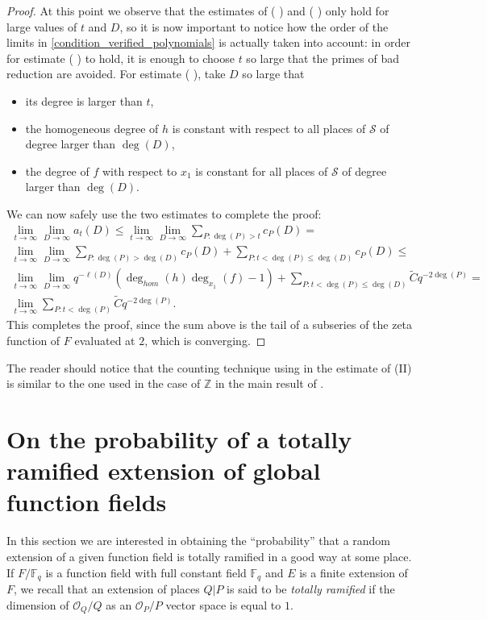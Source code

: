 \documentclass[10pt]{amsart}
\newcommand{\vF}{\mathbb{F}}
\newcommand{\vZ}{\mathbb{Z}}
\newcommand{\cO}{\mathcal{O}}
\newcommand{\cS}{\mathcal{S}}
\newcommand{\RN}[1]{%
  \textup{\uppercase\expandafter{\romannumeral#1}}%
}
\theoremstyle{definition}
\theoremstyle{remark}
\numberwithin{equation}{section}
\begin{document}
\begin{proof}
At this point we observe that the estimates of (\RN{1}) and (\RN{2}) only hold for large values of $t$ and $D$, so it is now important to notice how the order of the limits in \eqref{condition_verified_polynomials} is actually taken into account: in order for estimate (\RN{1}) to hold, it is enough to choose $t$ so large that the primes of bad reduction are avoided. For estimate (\RN{2}), take $D$ so large that 
\begin{itemize}
\item its degree is larger than $t$,
\item the homogeneous degree of $h$ is constant with respect to all places of $\cS$ of degree larger than $\deg(D)$,
\item the degree of $f$ with respect to $x_1$ is constant for all places of $\cS$ of degree larger than $\deg(D)$.
\end{itemize}
We can now safely use the two estimates to complete the proof:
\begin{align*}
\lim_{t\rightarrow \infty} \lim_{D\rightarrow \infty} a_t(D)\leq  \lim_{t\rightarrow \infty} \lim_{D\rightarrow \infty}\sum_{P:\deg(P)>t} c_P(D)=&\\
\lim_{t\rightarrow \infty} \lim_{D\rightarrow \infty} \sum_{P:\deg(P)> \deg(D)}c_P(D)+\sum_{P:t<\deg(P)\leq \deg(D)} c_P(D)\leq &\\
\lim_{t\rightarrow \infty} \lim_{D\rightarrow \infty} q^{-\ell(D)} (\deg_{hom}(h)\deg_{x_1}(f)-1)+ \sum_{P:t<\deg(P)\leq \deg(D)} \widetilde{C}q^{-2\deg(P)}=\\
\lim_{t\rightarrow \infty} \sum_{P:t<\deg(P)} \widetilde{C}q^{-2\deg(P)}.
\end{align*}
This completes the proof, since the sum above is the tail of a subseries of the zeta function of $F$ evaluated at $2$, which is converging.
\end{proof}

The reader should notice that the counting technique using in the estimate of (II) is similar to the one used in the case of $\vZ$ in the main result of \cite{torsten1991infinite}.

\section{On the probability of a totally ramified extension of global function fields}\label{sec:probabilityoftotram}

In this section we are interested in obtaining the ``probability'' that a random extension of a given function field is totally ramified in a good way at some place. 
If $F/\vF_q$ is a function field with full constant field $\vF_q$ and $E$ is a finite extension of $F$, we recall that an extension of places $Q|P$ is said to be \emph{totally ramified} if the dimension of  $\cO_Q/Q$ as an $\cO_P/P$ vector space is equal to $1$.
\end{document}
